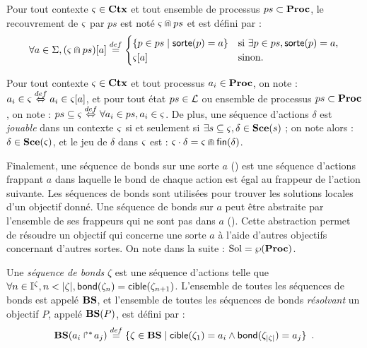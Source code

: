 \begin{definition}
  Pour tout contexte $\varsigma \in \mathbf{Ctx}$ et tout ensemble de processus $ps \subset \mathbf{Proc}$,
  le recouvrement de $\varsigma$ par $ps$ est noté $\varsigma \Cap ps$ et est défini par :
    \[ \forall a \in \Sigma, {(\varsigma \Cap ps)[a]} \stackrel{def}=
      \begin{cases}
        \{ p \in ps \mid \mathsf{sorte}(p)=a \} & \text{si } \exists p \in ps, \mathsf{sorte}(p)=a,\\
        {\varsigma[a]} & \text{sinon.}
      \end{cases} \]
\end{definition}

Pour tout contexte $\varsigma \in \mathbf{Ctx}$ et tout processus $a_i \in \mathbf{Proc}$, on note :
$a_i \in \varsigma \stackrel{def}\Leftrightarrow a_i \in {\varsigma[a]}$,
et pour tout état $ps \in \mathcal{L}$ ou ensemble de processus $ps \subset \mathbf{Proc}$, on note :
$ps \subseteq \varsigma \stackrel{def}\Leftrightarrow \forall a_i \in ps, a_i \in \varsigma$.
De plus, une séquence d'actions $\delta$ est \emph{jouable} dans un contexte $\varsigma$
si et seulement si $\exists s \subseteq \varsigma, \delta \in \mathbf{Sce}(s)$ ;
on note alors : $\delta \in \mathbf{Sce}(\varsigma)$,
et le jeu de $\delta$ dans $\varsigma$ est : $\varsigma \cdot \delta = \varsigma \Cap \mathsf{fin}(\delta)$.

Finalement, une séquence de bonds sur une sorte $a$ () est une séquence d'actions
frappant $a$ dans laquelle le bond de chaque action est égal au frappeur de l'action suivante.
Les séquences de bonds sont utilisées pour trouver les solutions locales d'un objectif donné.
Une séquence de bonds sur $a$ peut être abstraite par l'ensemble de ses frappeurs qui ne sont
pas dans $a$ ().
Cette abstraction permet de résoudre un objectif qui concerne une sorte $a$
à l'aide d'autres objectifs concernant d'autres sortes.
On note dans la suite : $\mathrm{Sol} = \wp(\mathbf{Proc})$.

\begin{definition}
  Une \emph{séquence de bonds} $\zeta$ est une séquence d'actions telle que
  $\forall n \in \mathbb{I}^{\zeta}, n < |\zeta|, \mathsf{bond}(\zeta_{n}) = \mathsf{cible}(\zeta_{n+1})$.
  L'ensemble de toutes les séquences de bonds est appelé $\mathbf{BS}$,
  et l'ensemble de toutes les séquences de bonds \emph{résolvant} un objectif $P$, appelé $\mathbf{BS}(P)$,
  est défini par :
    \[ \mathbf{BS}(\mbox{$a_i\Rsh^*\!a_j$}) \stackrel{def}= \{ \zeta \in \mathbf{BS} \mid
      \mathsf{cible}(\zeta_1) = a_i \wedge \mathsf{bond}(\zeta_{|\zeta|}) = a_j \} \enspace. \]
\end{definition}

